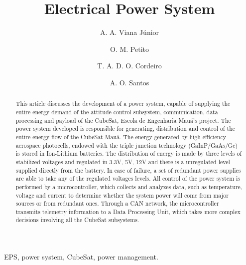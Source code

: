 \documentclass[3p]{elsarticle}
\begin{document}
\begin{frontmatter}

\title{Electrical Power System}


\author[label1,label5]{A. A. Viana J\'{u}nior}
\address[label1]{Pra\c{c}a Mau\'{a}, 1, S\~{a}o Caetano do Sul, S\~{a}o Paulo, Brasil}




\author[label1,label5]{O. M. Petito}
\address[label5]{Escola de Engenharia Mau\'{a} do Instituto Mau\'{a} de Tecnologia}

\author[label1,label5]{T. A. D. O. Cordeiro}

\author[label1,label5,label3]{A. O. Santos}


\begin{abstract}

	This article discusses the development of a power system, capable of supplying the entire energy demand of the attitude control subsystem, communication, data processing and payload of the CubeSat, Escola de Engenharia Mau\'{a}'s project. The power system developed is responsible for generating, distribution and control of the entire energy flow of the CubeSat Mau\'{a}. The energy generated by high efficiency aerospace photocells, endowed with the triple junction technology (GaInP/GaAs/Ge) is stored in Ion-Lithium batteries. The distribution of energy is made by three levels of stabilized voltages and regulated in 3.3V, 5V, 12V and there is a unregulated level supplied directly from the battery. In case of failure, a set of redundant power supplies are able to take any of the regulated voltages levels. All control of the power system is performed by a microcontroller, which collects and analyzes data, such as temperature, voltage and current to determine whether the system power will come from major sources or from redundant ones. Through a CAN network, the microcontroller transmits telemetry information to a Data Processing Unit, which takes more complex decisions involving all the CubeSat subsystems.

\end{abstract}

\begin{keyword}
 
	EPS, power system, CubeSat, power management.

\end{keyword}

\end{frontmatter}
\end{document}
